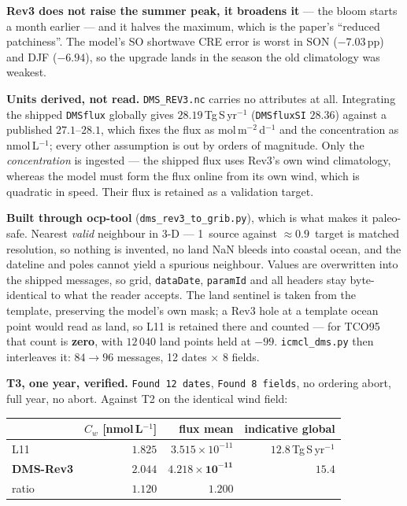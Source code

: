 \documentclass[10pt]{article}
\begin{document}
\noindent \textbf{Rev3 does not raise the summer peak, it broadens it} --- the bloom starts
a month earlier --- and it halves the maximum, which is the paper's ``reduced patchiness''.
The model's SO shortwave CRE error is worst in SON ($-7.03$\,pp) and DJF ($-6.94$), so the
upgrade lands in the season the old climatology was weakest.

\textbf{Units derived, not read.} \texttt{DMS\_REV3.nc} carries no attributes at all.
Integrating the shipped \texttt{DMSflux} globally gives $28.19$\,Tg\,S\,yr$^{-1}$
(\texttt{DMSfluxSI} $28.36$) against a published $27.1$--$28.1$, which fixes the flux as
mol\,m$^{-2}$\,d$^{-1}$ and the concentration as nmol\,L$^{-1}$; every other assumption is
out by orders of magnitude. Only the \emph{concentration} is ingested --- the shipped flux
uses Rev3's own wind climatology, whereas the model must form the flux online from its own
wind, which is quadratic in speed. Their flux is retained as a validation target.

\textbf{Built through ocp-tool} (\texttt{dms\_rev3\_to\_grib.py}), which is what makes it
paleo-safe. Nearest \emph{valid} neighbour in 3-D --- 1\textdegree\ source against
${\approx}0.9$\textdegree\ target is matched resolution, so nothing is invented, no land
NaN bleeds into coastal ocean, and the dateline and poles cannot yield a spurious
neighbour. Values are overwritten into the shipped messages, so grid, \texttt{dataDate},
\texttt{paramId} and all headers stay byte-identical to what the reader accepts. The land
sentinel is taken from the template, preserving the model's own mask; a Rev3 hole at a
template ocean point would read as land, so L11 is retained there and counted --- for TCO95
that count is \textbf{zero}, with $12\,040$ land points held at $-99$.
\texttt{icmcl\_dms.py} then interleaves it: $84\to96$ messages, 12 dates $\times$ 8 fields.

\textbf{T3, one year, verified.} \texttt{Found 12 dates}, \texttt{Found 8 fields}, no
ordering abort, full year, no abort. Against T2 on the identical wind field:

\begin{center}\footnotesize
\begin{tabular}{l r r r}
\toprule
 & $C_w$ [nmol\,L$^{-1}$] & flux mean & indicative global \\
\midrule
L11 & $1.825$ & $3.515\times10^{-11}$ & $12.8$\,Tg\,S\,yr$^{-1}$ \\
\textbf{DMS-Rev3} & $\mathbf{2.044}$ & $\mathbf{4.218\times10^{-11}}$ & $15.4$ \\
ratio & $1.120$ & $\mathbf{1.200}$ & \\
\bottomrule
\end{tabular}
\end{center}
\end{document}

